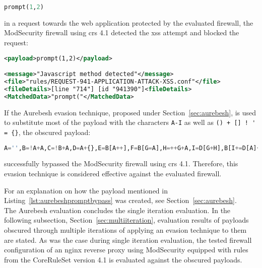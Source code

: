 \begin{lstlisting}[style=basicStyle, language=Python]
prompt(1,2)
\end{lstlisting}
in a request towards the web application protected by the evaluated firewall, the ModSecurity firewall using \acrshort{crs} 4.1 detected the \acrshort{xss} attempt and blocked the request:

\begin{lstlisting}[style=ruleStyle, language=XML, caption={prompt(1,2) blocked}, label=lst:promptblocked]
<payload>prompt(1,2)</payload>

<message>"Javascript method detected"</message>
<file>"rules/REQUEST-941-APPLICATION-ATTACK-XSS.conf"</file>
<fileDetails>[line "714"] [id "941390"]<fileDetails>
<MatchedData>"prompt("</MatchedData>
\end{lstlisting}
If the Aurebesh evasion technique, proposed under Section~\ref{sec:aurebesh}, is used to substitute most of the payload with the characters \verb|A-I| as well as \verb|() + [] ! ' = {}|, the obscured payload: 

\begin{lstlisting}[style=basicStyle, language=Python, caption={prompt(1,2) in Aurebesh.js bypass}, label={lst:aurebeshpromptbypass}]
A='',B=!A+A,C=!B+A,D=A+{},E=B[A++],F=B[G=A],H=++G+A,I=D[G+H],B[I+=D[A]+(B.C+D)[A]+C[H]+E+F+B[G]+I+E+D[A]+F][I]('p'+F+D[A]+'m'+'p'+E+'(A,++A)')()
\end{lstlisting}
successfully bypassed the ModSecurity firewall using \acrshort{crs} 4.1. Therefore, this evasion technique is considered effective against the evaluated firewall.

For an explanation on how the payload mentioned in Listing~\ref{lst:aurebeshpromptbypass} was created, see Section~\ref{sec:aurebesh}. \\

The Aurebesh evaluation concludes the single iteration evaluation. In the following subsection, Section~\ref{sec:multiiteration}, evaluation results of payloads obscured through multiple iterations of applying an evasion technique to them are stated. As was the case during single iteration evaluation, the tested firewall configuration of an nginx reverse proxy using ModSecurity equipped with rules from the CoreRuleSet version 4.1 is evaluated against the obscured payloads.
